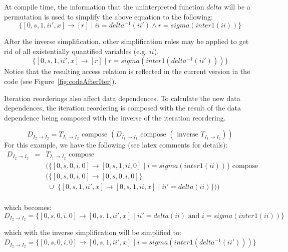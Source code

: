 \documentclass{article}
\begin{document}
At compile time, the information that the uninterpreted function $delta$ will be a permutation is used
to simplify the above equation to the following:
\[
	 \{  [ 0, s, 1, ii', x] \rightarrow  [ r ] \; | \; ii = delta^{-1}(ii') \wedge r = sigma( inter1(ii) ) \}
\]



After the inverse simplification, other simplification rules may be applied to get rid of all existentially quantified
variables (e.g. $ii$).
\[
	 \{  [ 0, s, 1, ii', x] \rightarrow  [ r ] \; | \; r = sigma( inter1( delta^{-1}(ii')) ) \}
\]
Notice that the resulting access relation is reflected in the current version in the code (see Figure~\ref{fig:codeAfterIter}).

Iteration reorderings also affect data dependences.  To calculate the new data dependences, the 
iteration reordering is composed with the result of the data dependence being composed with
the inverse of the iteration reordering.

\[
	D_{I_2  \rightarrow I_2} = T_{I_1 \rightarrow I_2}  \mbox{ compose }  (D_{I_1  \rightarrow I_1}  \mbox{ compose } (\mbox{ inverse } T_{I_1 \rightarrow I_2}) )
\]
For this example, we have the following (see latex comments for details):
\[
\begin{array}{rcl}
	D_{I_2  \rightarrow I_2} & = & T_{I_1 \rightarrow I_2}  \mbox{ compose } \\
	&  & ( \{ [0, s, 0, i, 0] \rightarrow [0, s, 1, ii, 0]  \; | \;  i = sigma(inter1(ii))\} \mbox{ compose } \\
	& & (\{ [0, s, 0, i, 0 ] \rightarrow [ 0, s, 0, i, 0]  \} \\
	& & \; \cup \; \{ [0, s, 1, ii', x ] \rightarrow [ 0, s, 1, ii, x] \; | \; ii' = delta(ii) \} )  ) \\
\end{array}
\]


which becomes:
\[
	D_{I_2  \rightarrow I_2}  = \{   [ 0, s, 0, i, 0 ] \rightarrow [0, s,1, ii', x ] \; | \; ii' = delta(ii) \mbox{ and } i = sigma(inter1(ii)) \} 
\]

which with the inverse simplification will be simplified to:
\[
	D_{I_2  \rightarrow I_2}  = \{   [ 0, s, 0, i, 0 ] \rightarrow [0, s,1, ii', x ] \; | \; i = sigma(inter1(delta^{-1}(ii'))) \} 
\]
\end{document}

